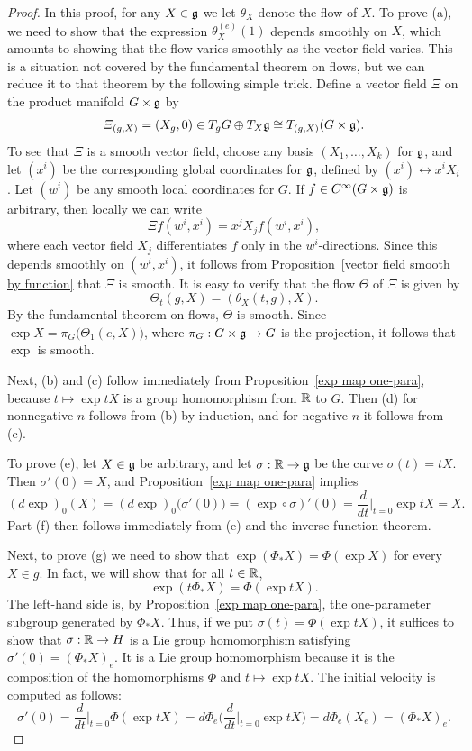 \begin{proof}
In this proof, for any $X\in\mathfrak{g}$ we let $\theta_X$ denote the flow of $X$. To prove (a), we need to show that the expression $\theta_X^{(e)}(1)$ depends smoothly on $X$, which amounts to showing that the flow varies smoothly as the vector field varies. This is a situation not covered by the fundamental theorem on flows, but we can reduce it to that theorem by the following simple trick. Define a vector field $\varXi$ on the product manifold $G\times\mathfrak{g}$ by
\[\varXi_{(g,X)}=(X_g,0)\in T_gG\oplus T_X\mathfrak{g}\cong T_{(g,X)}(G\times\mathfrak{g}).\]
To see that $\varXi$ is a smooth vector field, choose any basis $(X_1,\dots,X_k)$ for $\mathfrak{g}$, and let $(x^i)$ be the corresponding global coordinates for $\mathfrak{g}$, defined by $(x^i)\leftrightarrow x^iX_i$. Let $(w^i)$ be any smooth local coordinates for $G$. If $f\in C^\infty(G\times\mathfrak{g})$ is arbitrary, then locally we can write
\[\varXi f(w^i,x^i)=x^jX_jf(w^i,x^i),\]
where each vector field $X_j$ differentiates $f$ only in the $w^i$-directions. Since this depends smoothly on $(w^i,x^i)$, it follows from Proposition~\ref{vector field smooth by function} that $\varXi$ is smooth. It is easy to verify that the flow $\varTheta$ of $\varXi$ is given by
\[\varTheta_t(g,X)=(\theta_X(t,g),X).\]
By the fundamental theorem on flows, $\varTheta$ is smooth. Since $\exp X=\pi_G\big(\varTheta_1(e,X)\big)$, where $\pi_G:G\times\mathfrak{g}\to G$ is the projection, it follows that $\exp$ is smooth.\par
Next, (b) and (c) follow immediately from Proposition~\ref{exp map one-para}, because $t\mapsto\exp tX$ is a group homomorphism from $\mathbb{R}$ to $G$. Then (d) for nonnegative $n$ follows from (b) by induction, and for negative $n$ it follows from (c).\par
To prove (e), let $X\in\mathfrak{g}$ be arbitrary, and let $\sigma:\mathbb{R}\to\mathfrak{g}$ be the curve $\sigma(t)=tX$. Then $\sigma'(0)=X$, and Proposition~\ref{exp map one-para} implies
\[(d\exp)_0(X)=(d\exp)_0\big(\sigma'(0)\big)=(\exp\circ\sigma)'(0)=\frac{d}{dt}\Big|_{t=0}\exp tX=X.\]
Part (f) then follows immediately from (e) and the inverse function theorem.\par
Next, to prove (g) we need to show that $\exp(\varPhi_*X)=\varPhi(\exp X)$ for every $X\in g$. In fact, we will show that for all $t\in\mathbb{R}$,
\[\exp(t\varPhi_*X)=\varPhi(\exp tX).\]
The left-hand side is, by Proposition~\ref{exp map one-para}, the one-parameter subgroup generated by $\varPhi_*X$. Thus, if we put $\sigma(t)=\varPhi(\exp tX)$, it suffices to show that $\sigma:\mathbb{R}\to H$ is a Lie group homomorphism satisfying $\sigma'(0)=(\varPhi_*X)_e$. It is a Lie group homomorphism because it is the composition of the homomorphisms $\varPhi$ and $t\mapsto\exp tX$. The initial
velocity is computed as follows:
\[\sigma'(0)=\frac{d}{dt}\Big|_{t=0}\varPhi(\exp tX)=d\varPhi_e\Big(\frac{d}{dt}\Big|_{t=0}\exp tX\Big)=d\varPhi_e(X_e)=(\varPhi_* X)_e.\]


\end{proof}
